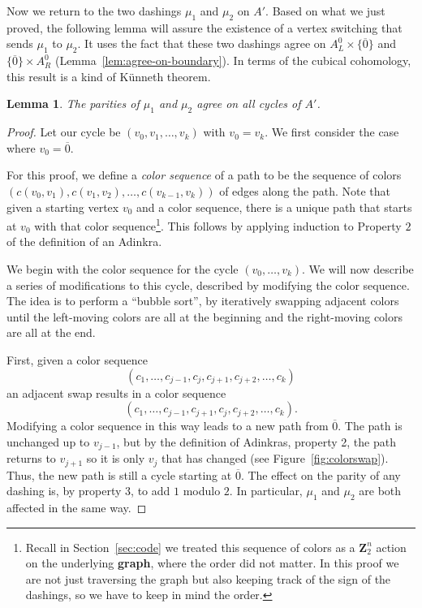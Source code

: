 \documentclass[12pt,twoside,singlespace]{article}
\numberwithin{equation}{section}
\newtheorem{lem}[equation]{Lemma}
\theoremstyle{definition}
\newcommand{\ZZ}{\mathbf{Z}}
\begin{document}
Now we return to the two dashings $\mu_1$ and $\mu_2$ on $A'$.  Based on what we just proved, the following lemma will assure the existence of a vertex switching that sends $\mu_1$ to $\mu_2$.  It uses the fact that these two dashings agree on $A_L^0\times\{\overline{0}\}$ and $\{\overline{0}\}\times A_R^0$ (Lemma~\ref{lem:agree-on-boundary}).  In terms of the cubical cohomology, this result is a kind of K\"unneth theorem.


\begin{lem}
\label{lem:switch12}
The parities of $\mu_1$ and $\mu_2$ agree on all cycles of $A'$.
\end{lem}
\begin{proof}
Let our cycle be $(v_0,v_1,\ldots,v_k)$ with $v_0=v_k$.  We first consider the case where $v_0=\overline{0}$.

For this proof, we define a \emph{color sequence} of a path to be the sequence of colors $(c(v_0,v_1),c(v_1,v_2),\ldots,c(v_{k-1},v_k))$ of edges along the path.  Note that given a starting vertex $v_0$ and a color sequence, there is a unique path that starts at $v_0$ with that color sequence\footnote{Recall in Section~\ref{sec:code} we treated this sequence of colors as a $\ZZ_2^n$ action on the underlying \textbf{graph}, where the order did not matter. In this proof we are not just traversing the graph but also keeping track of the sign of the dashings, so we have to keep in mind the order.}.  This follows by applying induction to Property $2$ of the definition of an Adinkra. 

We begin with the color sequence for the cycle $(v_0,\ldots,v_k)$.  We will now describe a series of modifications to this cycle, described by modifying the color sequence.  The idea is to perform a ``bubble sort'', by iteratively swapping adjacent colors until the left-moving colors are all at the beginning and the right-moving colors are all at the end.

First, given a color sequence
\[(c_1,\ldots,c_{j-1},c_j,c_{j+1},c_{j+2},\ldots,c_k)\]
an adjacent swap results in a color sequence
\[(c_1,\ldots,c_{j-1},c_{j+1},c_j,c_{j+2},\ldots,c_k).\]
Modifying a color sequence in this way leads to a new path from $\overline{0}$.  The path is unchanged up to $v_{j-1}$, but by the definition of Adinkras, property 2, the path returns to $v_{j+1}$ so it is only $v_j$ that has changed (see Figure~\ref{fig:colorswap}).  Thus, the new path is still a cycle starting at $\overline{0}$.  The effect on the parity of any dashing is, by property 3, to add $1$ modulo $2$.  In particular, $\mu_1$ and $\mu_2$ are both affected in the same way.


\end{proof}
\end{document}
